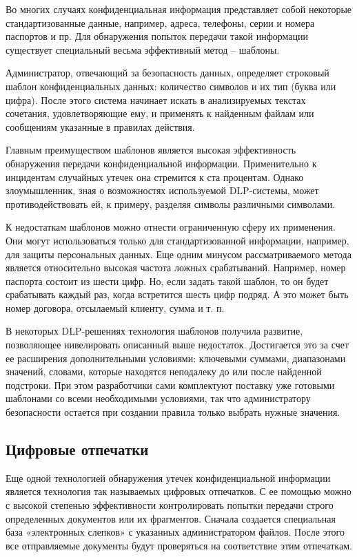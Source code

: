 Во многих случаях конфиденциальная информация представляет собой некоторые стандартизованные данные, например, адреса, телефоны, серии и номера паспортов  и пр. Для обнаружения попыток передачи такой информации существует специальный весьма эффективный метод – шаблоны.

Администратор, отвечающий за безопасность данных, определяет строковый шаблон конфиденциальных данных: количество символов и их тип (буква или цифра). После этого система начинает искать в анализируемых текстах сочетания, удовлетворяющие ему, и применять к найденным файлам или сообщениям указанные в правилах действия.

Главным преимуществом шаблонов является высокая эффективность обнаружения передачи конфиденциальной информации. Применительно к инцидентам случайных утечек она стремится к ста процентам. Однако злоумышленник, зная о возможностях используемой DLP-системы, может противодействовать ей, к примеру, разделяя символы различными символами.

К недостаткам шаблонов можно отнести ограниченную сферу их применения. Они могут использоваться только для стандартизованной информации, например, для защиты персональных данных. Еще одним минусом рассматриваемого метода является относительно высокая частота ложных срабатываний. Например, номер паспорта состоит из шести цифр. Но, если задать такой шаблон, то он будет срабатывать каждый раз, когда встретится шесть цифр подряд. А это может быть номер договора, отсылаемый клиенту, сумма и т. п.

В некоторых DLP-решениях технология шаблонов получила развитие, позволяющее нивелировать описанный выше недостаток. Достигается это за счет ее расширения дополнительными условиями: ключевыми суммами, диапазонами значений, словами, которые находятся неподалеку до или после найденной подстроки. При этом разработчики сами комплектуют поставку уже готовыми шаблонами со всеми необходимыми условиями, так что администратору безопасности остается при создании правила только выбрать нужные значения.

\subsection{Цифровые отпечатки}

Еще одной технологией обнаружения утечек конфиденциальной информации является технология так называемых цифровых отпечатков. С ее помощью можно с высокой степенью эффективности контролировать попытки передачи строго определенных документов или их фрагментов. Сначала создается специальная база «электронных слепков» с указанных администратором файлов. После этого все отправляемые документы будут проверяться на соответствие этим отпечаткам.


